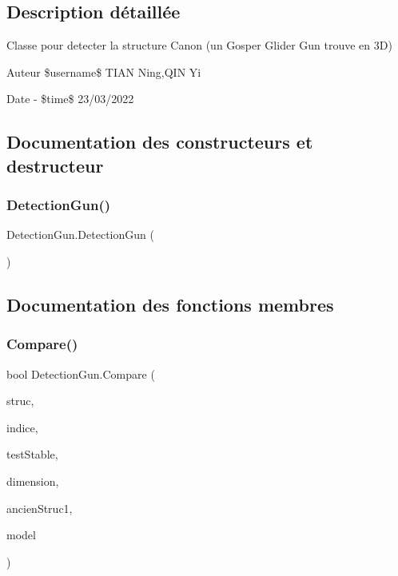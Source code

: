 \subsection{Description détaillée}
Classe pour detecter la structure Canon (un Gosper Glider Gun trouve en 3D) \begin{DoxyAuthor}{Auteur}
\$username\$ T\+I\+AN Ning,Q\+IN Yi 
\end{DoxyAuthor}
\begin{DoxyDate}{Date}
-\/ \$time\$ 23/03/2022 
\end{DoxyDate}


\subsection{Documentation des constructeurs et destructeur}
\mbox{\label{class_detection_gun_a7fd1d6b8de83ef57d12bf0337833372b}} 
\subsubsection{\texorpdfstring{Detection\+Gun()}{DetectionGun()}}
{\footnotesize\ttfamily Detection\+Gun.\+Detection\+Gun (\begin{DoxyParamCaption}{ }\end{DoxyParamCaption})\hspace{0.3cm}{\ttfamily [inline]}}



\subsection{Documentation des fonctions membres}
\mbox{\label{class_detection_gun_a664491436b7ca39a34f4146754a6ae71}} 
\subsubsection{\texorpdfstring{Compare()}{Compare()}}
{\footnotesize\ttfamily bool Detection\+Gun.\+Compare (\begin{DoxyParamCaption}\item[{List$<$ \mbox{\hyperlink{class_list_vector_gun}{List\+Vector\+Gun}} $>$}]{struc,  }\item[{int}]{indice,  }\item[{bool}]{test\+Stable,  }\item[{int}]{dimension,  }\item[{List$<$ \mbox{\hyperlink{class_list_vector_gun}{List\+Vector\+Gun}} $>$}]{ancien\+Struc1,  }\item[{List$<$ \mbox{\hyperlink{class_list_vector_gun}{List\+Vector\+Gun}} $>$}]{model }\end{DoxyParamCaption})\hspace{0.3cm}{\ttfamily [inline]}}



